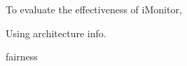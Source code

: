 \documentclass[preprint]{sigplanconf}
\begin{document}
To evaluate the effectiveness of iMonitor, 

Using architecture info.

fairness









\appendix
\end{document}

